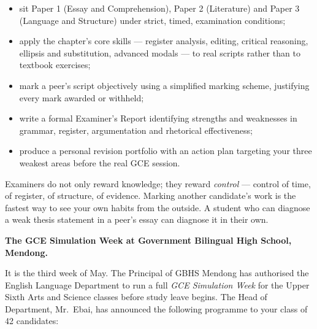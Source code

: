 \documentclass[11pt]{article}
\newcommand{\cle}[1]{{\popxbold\color{popdark}#1}}
\newcounter{popsec}
\newcounter{popsub}
\newcommand{\courssub}[1]{%
  \stepcounter{popsub}%
  \par\vspace{9pt}\noindent{\popxbold\fontsize{11.5}{13}\selectfont\color{popink}{\color{poporange}\thepopsec.\thepopsub}\hspace{6pt}#1}\par\nopagebreak\vspace{4pt}
}
\begin{document}
\begin{itemize}
\item sit Paper 1 (Essay and Comprehension), Paper 2 (Literature) and Paper 3 (Language and Structure) under strict, timed, examination conditions;
\item apply the chapter's core skills — \cle{register analysis}, \cle{editing}, \cle{critical reasoning}, \cle{ellipsis and substitution}, \cle{advanced modals} — to real scripts rather than to textbook exercises;
\item mark a peer's script objectively using a simplified marking scheme, justifying every mark awarded or withheld;
\item write a formal \cle{Examiner's Report} identifying strengths and weaknesses in grammar, register, argumentation and rhetorical effectiveness;
\item produce a personal \cle{revision portfolio} with an action plan targeting your three weakest areas before the real GCE session.
\end{itemize}

\begin{aretenir}
Examiners do not only reward knowledge; they reward \emph{control} — control of time, of register, of structure, of evidence. Marking another candidate's work is the fastest way to see your own habits from the outside. A student who can diagnose a weak thesis statement in a peer's essay can diagnose it in their own.
\end{aretenir}

\courssub{Situation}

\textbf{The GCE Simulation Week at Government Bilingual High School, Mendong.}

It is the third week of May. The Principal of GBHS Mendong has authorised the English Language Department to run a full \emph{GCE Simulation Week} for the Upper Sixth Arts and Science classes before study leave begins. The Head of Department, Mr.\ Ebai, has announced the following programme to your class of 42 candidates:
\end{document}
